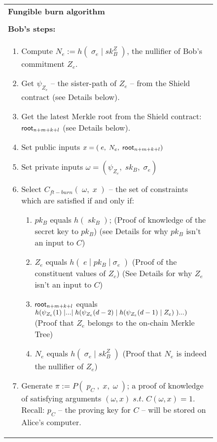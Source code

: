 \begin{figure}[htp]
  \ContinuedFloat*
	\begin{center}
		\begin{framed}
      \begin{tabular}{p{16cm}}	
        \textbf{Fungible burn algorithm} \\
        \\
        \midrule
        \textbf{Bob's steps:}\\
        \begin{enumerate}
          \setcounter{enumi}{\value{ongoingEnumCounter}}
          \item Compute $N_e := h(\;\sigma_e\;|\;sk^Z_B\;)$, the nullifier of Bob's commitment $Z_e$.
          \item Get $\psi_{Z_e}$ -- the sister-path of $Z_e$ -- from the Shield contract (see Details below).
          \item Get the latest Merkle root from the Shield contract: $\mathsf{root}_{n+m+k+l}$ (see Details below).
          \item Set public inputs $x = (\;e,\;N_e,\;\mathsf{root}_{n+m+k+l})$
          \item Set private inputs $\omega = (\psi_{Z_e},\;sk_B,\;\sigma_e)$
          \item Select $C_{ft-burn}(\;\omega,\;x\;)$ -- the set of constraints which are satisfied if and only if:
          \begin{enumerate}
            \item $pk_B$ equals $h(\;sk_B\;)$; (Proof of knowledge of the secret key to $pk_B$) (see Details for why $pk_B$ isn't an input to $C$)
            \item $Z_e$ equals $h(\;e\;|\;pk_B\;|\;\sigma_e\;)$ (Proof of the constituent values of $Z_c$)
            (See Details for why $Z_e$ isn't an input to $C$)
            \item $\mathsf{root}_{n+m+k+l}$ equals $h\br*{\psi_{Z_e}(1)\;|...|\;h\br*{\psi_{Z_e}(d-2)\;|\;h\br*{\psi_{Z_e}(d-1)\;|\;Z_e}\;}...}$ (Proof that $Z_e$ belongs to the on-chain Merkle Tree)
            \item $N_e$ equals $h(\;\sigma_e\;|\;sk^Z_B\;)$ (Proof that $N_e$ is indeed the nullifier of $Z_e$)
          \end{enumerate}
          \item Generate $\pi := P(\;p_C\;,\;x,\;\omega\;)$; a proof of knowledge of satisfying arguments $(\omega, x)\;s.t.\;C(\omega, x) = 1$. Recall: $p_C$ -- the proving key for $C$ -- will be stored on Alice's computer.
           

\end{enumerate}
\end{tabular}
\end{framed}
\end{center}
\end{figure}
